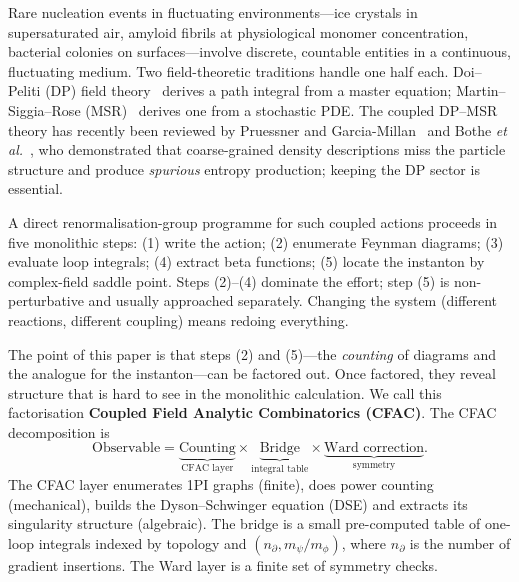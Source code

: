 \documentclass[11pt,a4paper]{article}
\theoremstyle{plain}
\begin{document}
Rare nucleation events in fluctuating environments---ice crystals
in supersaturated air, amyloid fibrils at physiological monomer
concentration, bacterial colonies on surfaces---involve discrete,
countable entities in a continuous, fluctuating medium.  Two
field-theoretic traditions handle one half each.  Doi--Peliti
(DP) field theory~\cite{Doi1976,Peliti1985} derives a path
integral from a master equation; Martin--Siggia--Rose
(MSR)~\cite{MSR1973,Janssen1976,DeDominicis1976} derives one from
a stochastic PDE.  The coupled DP--MSR theory has recently been
reviewed by Pruessner and Garcia-Millan~\cite{PruessnerGarciaMillan2025}
and Bothe \textit{et al.}~\cite{Bothe2023}, who demonstrated that
coarse-grained density descriptions miss the particle structure
and produce \emph{spurious} entropy production; keeping the DP
sector is essential.

A direct renormalisation-group programme for such coupled actions
proceeds in five monolithic steps: (1) write the action; (2)
enumerate Feynman diagrams; (3) evaluate loop integrals; (4)
extract beta functions; (5) locate the instanton by complex-field
saddle point.  Steps (2)--(4) dominate the effort; step (5) is
non-perturbative and usually approached separately.  Changing
the system (different reactions, different coupling) means
redoing everything.

The point of this paper is that steps (2) and (5)---the
\emph{counting} of diagrams and the analogue for the
instanton---can be factored out.  Once factored, they reveal
structure that is hard to see in the monolithic calculation.  We
call this factorisation \textbf{Coupled Field Analytic
Combinatorics (CFAC)}.  The CFAC decomposition is
\begin{equation}\label{eq:decomposition}
  \text{Observable}
  = \underbrace{\text{Counting}}_{\text{CFAC layer}}
  \times \underbrace{\text{Bridge}}_{\text{integral table}}
  \times \underbrace{\text{Ward correction}}_{\text{symmetry}}.
\end{equation}
The CFAC layer enumerates 1PI graphs (finite), does power counting
(mechanical), builds the Dyson--Schwinger equation (DSE) and
extracts its singularity structure (algebraic).  The bridge is a
small pre-computed table of one-loop integrals indexed by topology
and $(n_\partial, m_\psi/m_\phi)$, where $n_\partial$ is the
number of gradient insertions.  The Ward layer is a finite set of
symmetry checks.
\end{document}
